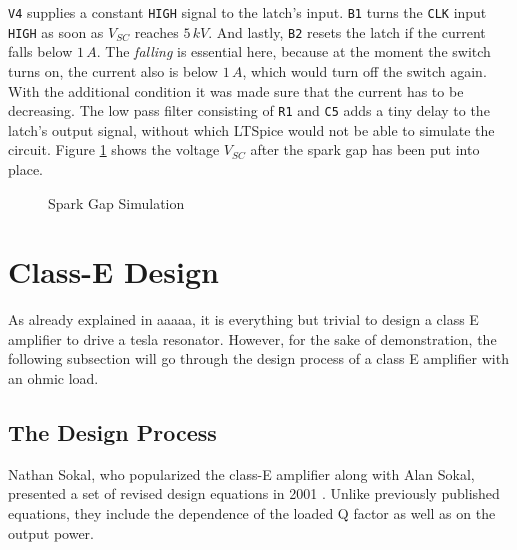 \texttt{V4} supplies a constant \texttt{HIGH} signal to the latch's input. \texttt{B1} turns the \texttt{CLK} input \texttt{HIGH} as soon as \(V_{SC}\) reaches \(5\,kV\). And lastly, \texttt{B2} resets the latch if the current falls below \(1\,A\). The \emph{falling} is essential here, because at the moment the switch turns on, the current also is below \(1\,A\), which would turn off the switch again. With the additional  condition it was made sure that the current has to be decreasing. The low pass filter consisting of \texttt{R1} and \texttt{C5} adds a tiny delay to the latch's output signal, without which LTSpice would not be able to simulate the circuit. Figure \ref{fig:spark-gap-simulation} shows the voltage \(V_{SC}\) after the spark gap has been put into place.

\begin{figure}[h!]
    \centering
    \caption{Spark Gap Simulation}
    \label{fig:spark-gap-simulation}
\end{figure}

\section{Class-E Design}

As already explained in aaaaa, it is everything but trivial to design a class E amplifier to drive a tesla resonator. However, for the sake of demonstration, the following subsection will go through the design process of a class E amplifier with an ohmic load.

\subsection{The Design Process}
\label{subsec:the-design-process}

Nathan Sokal, who popularized the class-E amplifier along with Alan Sokal, presented a set of revised design equations in 2001 . Unlike previously published equations, they include the dependence of the loaded Q factor as well as on the output power.

